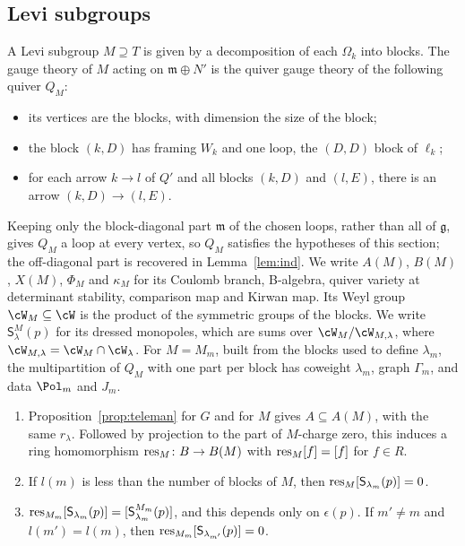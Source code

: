 \documentclass[11pt]{amsart}
\begin{document}
\subsection{Levi subgroups}\label{ss:levi}
A Levi subgroup $M\supseteq T$ is given by a decomposition of each
$\Omega_k$ into blocks.  The gauge theory of $M$ acting on $\mathfrak
m\oplus N'$ is the quiver gauge theory of the following quiver $Q_M$:
\begin{itemize}[leftmargin=2em]
\item its vertices are the blocks, with dimension the size of the block;
\item the block $(k,D)$ has framing $W_k$ and one loop, the $(D,D)$ block of
$\ell_k$;
\item for each arrow $k\to l$ of $Q'$ and all blocks $(k,D)$ and $(l,E)$,
there is an arrow $(k,D)\to(l,E)$.
\end{itemize}
Keeping only the block-diagonal part $\mathfrak m$ of the chosen loops, rather
than all of $\mathfrak g$, gives $Q_M$ a loop at every vertex, so $Q_M$
satisfies the hypotheses of this section; the off-diagonal part is recovered
in Lemma~\ref{lem:ind}.  We write $A(M)$,
$B(M)$, $X(M)$, $\Phi_M$ and $\kappa_M$ for its Coulomb branch, B-algebra,
quiver variety at determinant stability, comparison map and Kirwan map.
Its Weyl group $\cW_M\subseteq\cW$ is the product of the symmetric groups
of the blocks.  We write $\mathsf S^M_\lambda(p)$ for its dressed monopoles,
which are sums over $\cW_M/\cW_{M,\lambda}$, where
$\cW_{M,\lambda}=\cW_M\cap\cW_\lambda$.  For $M=M_m$, built from the blocks used to
define $\lambda_m$, the multipartition of $Q_M$ with one part per block has
coweight $\lambda_m$, graph $\Gamma_m$, and data $\Pol_m$ and $J_m$.

\begin{lemma}[restriction]\label{lem:restr}
\begin{enumerate}[leftmargin=2em]
\item Proposition~\ref{prop:teleman} for $G$ and for $M$ gives $A\subseteq
A(M)$, with the same $r_\lambda$.  Followed by projection to the part of
$M$-charge zero, this induces a ring homomorphism
$\operatorname{res}_M\colon B\to B(M)$ with $\operatorname{res}_M[f]=[f]$ for $f\in R$.
\item If $l(m)$ is less than the number of blocks of $M$, then
$\operatorname{res}_M[\mathsf S_{\lambda_m}(p)]=0$.
\item $\operatorname{res}_{M_m}[\mathsf S_{\lambda_m}(p)]=[\mathsf
S^{M_m}_{\lambda_m}(p)]$, and this depends only on $\epsilon(p)$.  If
$m'\neq m$ and $l(m')=l(m)$, then $\operatorname{res}_{M_m}[\mathsf S_{\lambda_{m'}}(p)]=0$.
\end{enumerate}
\end{lemma}
\end{document}
